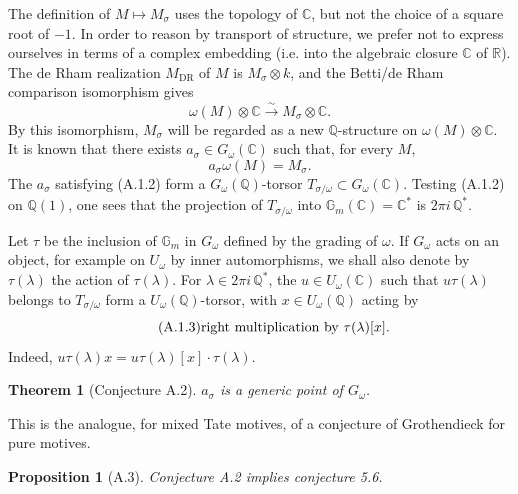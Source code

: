 \documentclass[10pt,a4paper]{article}
\newcommand{\Gm}{\mathbb G_m}
\newcommand{\Q}{\mathbb Q}
\newcommand{\C}{\mathbb C}
\newcommand{\R}{\mathbb R}
\theoremstyle{deligne}
\newtheorem*{theorem*}{Theorem}
\newtheorem*{proposition*}{Proposition}
\begin{document}
The definition of \(M\mapsto M_\sigma\) uses the topology of \(\C\), but not the choice of a square root of \(-1\). In order to reason by transport of structure, we prefer not to express ourselves in terms of a complex embedding (i.e. into the algebraic closure \(\C\) of \(\R\)). The de Rham realization \(M_{\mathrm{DR}}\) of \(M\) is \(M_\sigma\otimes k\), and the Betti/de Rham comparison isomorphism gives
\[
\tag{A.1.1}
\omega(M)\otimes\C\overset{\sim}{\longrightarrow}M_\sigma\otimes\C.
\]
By this isomorphism, \(M_\sigma\) will be regarded as a new \(\Q\)-structure on \(\omega(M)\otimes\C\). It is known that there exists \(a_\sigma\in G_\omega(\C)\) such that, for every \(M\),
\[
\tag{A.1.2}
a_\sigma\omega(M)=M_\sigma.
\]
The \(a_\sigma\) satisfying (A.1.2) form a \(G_\omega(\Q)\)-torsor \(T_{\sigma/\omega}\subset G_\omega(\C)\). Testing (A.1.2) on \(\Q(1)\), one sees that the projection of \(T_{\sigma/\omega}\) into \(\Gm(\C)=\C^*\) is \(2\pi i\,\Q^*\).

Let \(\tau\) be the inclusion of \(\Gm\) in \(G_\omega\) defined by the grading of \(\omega\). If \(G_\omega\) acts on an object, for example on \(U_\omega\) by inner automorphisms, we shall also denote by \(\tau(\lambda)\) the action of \(\tau(\lambda)\). For \(\lambda\in2\pi i\,\Q^*\), the \(u\in U_\omega(\C)\) such that \(u\tau(\lambda)\) belongs to \(T_{\sigma/\omega}\) form a \(U_\omega(\Q)\)-torsor, with \(x\in U_\omega(\Q)\) acting by
\[
\tag{A.1.3}
\hbox{right multiplication by }\tau(\lambda)[x].
\]
Indeed, \(u\tau(\lambda)x=u\tau(\lambda)[x]\cdot\tau(\lambda)\).

\begin{theorem*}[Conjecture A.2]
\(a_\sigma\) is a generic point of \(G_\omega\).
\end{theorem*}

This is the analogue, for mixed Tate motives, of a conjecture of Grothendieck for pure motives.

\begin{proposition*}[A.3]
Conjecture A.2 implies conjecture 5.6.
\end{proposition*}
\end{document}
